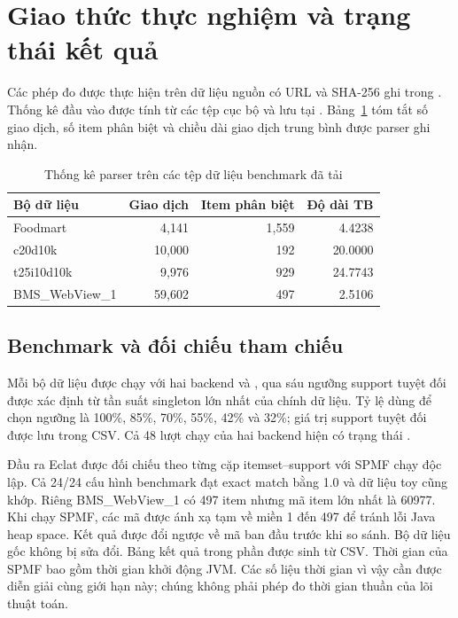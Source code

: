 
\section{Giao thức thực nghiệm và trạng thái kết quả}

Các phép đo được thực hiện trên dữ liệu nguồn có URL và SHA-256 ghi trong . Thống kê đầu vào được tính từ các tệp cục bộ và lưu tại . Bảng~\ref{tab:datasetobserved} tóm tắt số giao dịch, số item phân biệt và chiều dài giao dịch trung bình được parser ghi nhận.

\begin{table}[t]
\centering\caption{Thống kê parser trên các tệp dữ liệu benchmark đã tải}\label{tab:datasetobserved}
\begin{tabular}{@{}lrrr@{}}\toprule
Bộ dữ liệu & Giao dịch & Item phân biệt & Độ dài TB\\\midrule
Foodmart & 4,141 & 1,559 & 4.4238\\
c20d10k & 10,000 & 192 & 20.0000\\
t25i10d10k & 9,976 & 929 & 24.7743\\
BMS\_WebView\_1 & 59,602 & 497 & 2.5106\\\bottomrule
\end{tabular}
\end{table}

\subsection{Benchmark và đối chiếu tham chiếu}
Mỗi bộ dữ liệu được chạy với hai backend  và , qua sáu ngưỡng support tuyệt đối được xác định từ tần suất singleton lớn nhất của chính dữ liệu. Tỷ lệ dùng để chọn ngưỡng là 100\%, 85\%, 70\%, 55\%, 42\% và 32\%; giá trị support tuyệt đối được lưu trong CSV. Cả 48 lượt chạy của hai backend hiện có trạng thái .

Đầu ra Eclat được đối chiếu theo từng cặp itemset--support với SPMF chạy độc lập. Cả 24/24 cấu hình benchmark đạt exact match bằng 1.0 và dữ liệu toy cũng khớp. Riêng BMS\_WebView\_1 có 497 item nhưng mã item lớn nhất là 60977. Khi chạy SPMF, các mã được ánh xạ tạm về miền 1 đến 497 để tránh lỗi Java heap space. Kết quả được đổi ngược về mã ban đầu trước khi so sánh. Bộ dữ liệu gốc không bị sửa đổi.
Bảng kết quả trong phần  được sinh từ CSV. Thời gian của SPMF bao gồm thời gian khởi động JVM. Các số liệu thời gian vì vậy cần được diễn giải cùng giới hạn này; chúng không phải phép đo thời gian thuần của lõi thuật toán.

